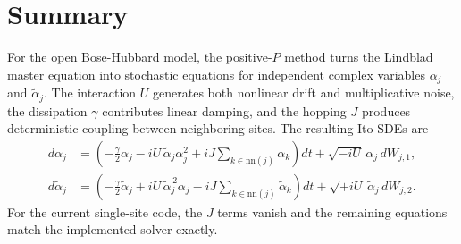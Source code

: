\documentclass[12pt]{article}
\begin{document}
\section*{Summary}
For the open Bose-Hubbard model, the positive-$P$ method turns the Lindblad master equation into stochastic equations for independent complex variables $\alpha_j$ and $\widetilde{\alpha}_j$. The interaction $U$ generates both nonlinear drift and multiplicative noise, the dissipation $\gamma$ contributes linear damping, and the hopping $J$ produces deterministic coupling between neighboring sites. The resulting Ito SDEs are
\begin{align*}
d\alpha_j
&=
\left(
-\frac{\gamma}{2}\alpha_j
-iU\,\widetilde{\alpha}_j\alpha_j^2
+iJ\sum_{k\in \mathrm{nn}(j)} \alpha_k
\right)dt
+ \sqrt{-iU}\,\alpha_j\,dW_{j,1}, \\
d\widetilde{\alpha}_j
&=
\left(
-\frac{\gamma}{2}\widetilde{\alpha}_j
+iU\,\widetilde{\alpha}_j^{\,2}\alpha_j
-iJ\sum_{k\in \mathrm{nn}(j)} \widetilde{\alpha}_k
\right)dt
+ \sqrt{+iU}\,\widetilde{\alpha}_j\,dW_{j,2}.
\end{align*}
For the current single-site code, the $J$ terms vanish and the remaining equations match the implemented solver exactly.
\end{document}
